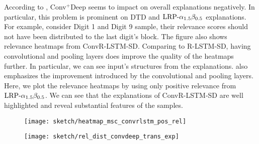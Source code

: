 According to \addfigure{\ref{fig:heatmap_msc_convtran_exp}}, Conv$^+$Deep seems to impact on overall explanations negatively. In particular, this problem is prominent on DTD and $\text{LRP-}\alpha_{1.5}\beta_{0.5}$ explanations. For example, consider Digit 1 and Digit 9 sample, their relevance scores should not have been distributed to the last digit's block. The figure also shows relevance heatmaps from ConvR-LSTM-SD. Comparing to R-LSTM-SD, having convolutional and pooling layers does improve  the quality of the heatmaps further. In particular, we can see input's structures from the explanations. \addfigure{\ref{fig:heatmap_msc_convrlstm_pos_rel}} also emphasizes the improvement introduced by the convolutional and pooling layers. Here, we plot the relevance heatmaps by using only positive relevance from $\text{LRP-}\alpha_{1.5}\beta_{0.5}$. We can see that the explanations of ConvR-LSTM-SD are well highlighted and reveal substantial features of the samples.



%
%



 \begin{figure}[!htb]
\centering
\texttt{[image: sketch/heatmap\_msc\_convrlstm\_pos\_rel]}
\label{fig:heatmap_msc_convrlstm_pos_rel}
\end{figure}

 \begin{figure}[!htb]
\centering
\texttt{[image: sketch/rel\_dist\_convdeep\_trans\_exp]}
\label{fig:rel_dist_convdeep_trans_exp}
\end{figure}

